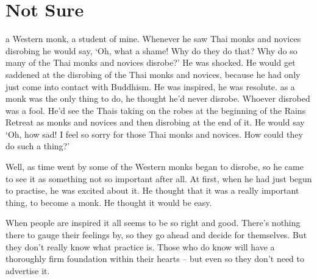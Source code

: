 
\renewcommand{\chapterFootnotemark}{\footnotemark}
\renewcommand{\chapterFootnotetext}{\footnotetext{\textit{Note}: This talk has been published elsewhere under the title: `\textit{Not Sure! -- The Standard of the Noble Ones}'}}

\chapter{Not Sure}

 a Western monk, a student of mine. Whenever he saw Thai monks and novices disrobing he would say, `Oh, what a shame! Why do they do that? Why do so many of the Thai monks and novices disrobe?' He was shocked. He would get saddened at the disrobing of the Thai monks and novices, because he had only just come into contact with Buddhism. He was inspired, he was resolute.  as a monk was the only thing to do, he thought he'd never disrobe. Whoever disrobed was a fool. He'd see the Thais taking on the robes at the beginning of the Rains Retreat as monks and novices and then disrobing at the end of it. He would say `Oh, how sad! I feel so sorry for those Thai monks and novices. How could they do such a thing?' 

Well, as time went by some of the Western monks began to disrobe, so he came to see it as something not so important after all. At first, when he had just begun to practise, he was excited about it. He thought that it was a really important thing, to become a monk. He thought it would be easy. 

When people are inspired it all seems to be so right and good. There's nothing there to gauge their feelings by, so they go ahead and decide for themselves. But they don't really know what practice is. Those who do know will have a thoroughly firm foundation within their hearts -- but even so they don't need to advertise it. 

